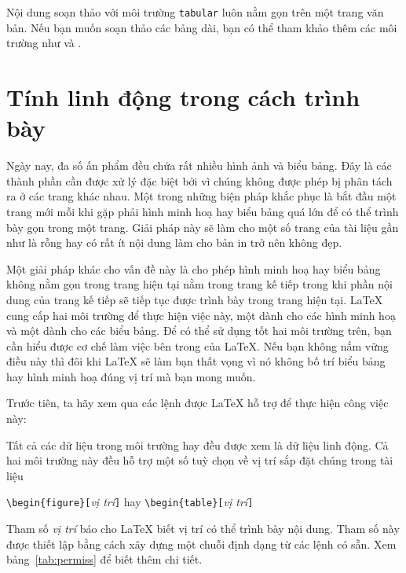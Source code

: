 Nội dung soạn thảo với môi trường \texttt{tabular} luôn nằm gọn trên một trang văn bản. Nếu bạn muốn soạn thảo các bảng dài, bạn có thể tham khảo thêm các môi trường như  và .

\section{Tính linh động trong cách trình bày}
Ngày nay, đa số ấn phẩm đều chứa rất nhiều hình ảnh và biểu bảng. Đây là các thành phần cần được xử lý đặc biệt bởi vì chúng không được phép bị phân tách ra ở các trang khác nhau. Một trong những biện pháp khắc phục là bắt đầu một trang mới mỗi khi gặp phải hình minh hoạ hay biểu bảng quá lớn để có thể trình bày gọn trong một trang. Giải pháp này sẽ làm cho một số trang của tài liệu gần như là rỗng hay có rất ít nội dung làm cho bản in trở nên không đẹp.

Một giải pháp khác cho vấn đề này là cho phép hình minh hoạ hay biểu bảng không nằm gọn trong trang hiện tại nằm trong trang kế tiếp trong khi phần nội dung của trang kế tiếp sẽ tiếp tục được trình bày trong trang hiện tại. \LaTeX{} cung cấp hai môi trường để thực hiện việc này, một dành cho các hình minh hoạ và một dành cho các biểu bảng. Để có thể sử dụng tốt hai môi trường trên, bạn cần hiểu được cơ chế làm việc bên trong của \LaTeX{}. Nếu bạn không nắm vững điều này thì đôi khi \LaTeX{} sẽ làm bạn thất vọng vì nó không bố trí biểu bảng hay hình minh hoạ đúng vị trí mà bạn mong muốn.

\bigskip
Trước tiên, ta hãy xem qua các lệnh được \LaTeX{} hỗ trợ để thực hiện công việc này:

Tất cả các dữ liệu trong môi trường  hay  đều được xem là dữ liệu linh động. Cả hai môi trường này đều hỗ trợ một số tuỳ chọn về vị trí sắp đặt chúng trong tài liệu

\begin{lscommand}
\verb|\begin{figure}[|\emph{vị trí}\verb|]| hay
\verb|\begin{table}[|\emph{vị trí}\verb|]|
\end{lscommand}
%
Tham số \emph{vị trí} báo cho \LaTeX{} biết vị trí có thể trình bày nội dung. Tham số này được thiết lập bằng cách xây dựng một chuỗi định dạng từ các lệnh có sẵn. Xem bảng~\ref{tab:permiss} để biết thêm chi tiết.

